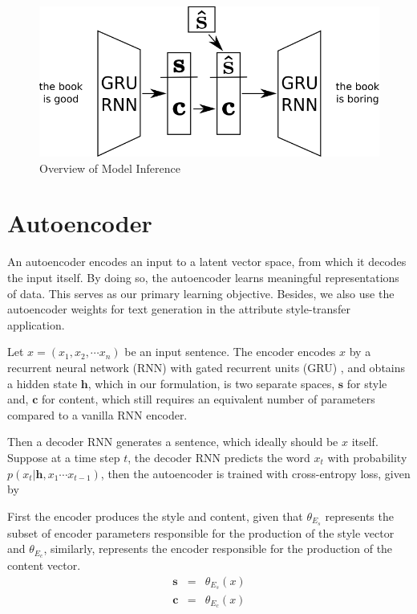 \begin{figure}[ht]
	\centering
	\includegraphics[width=\linewidth]{images/model-overview-inference}
	\caption{Overview of Model Inference}
	\label{fig:model-overview-inference}
\end{figure}


\section{Autoencoder} \label{ssec:seq2seq-objective}

An autoencoder encodes an input to a latent vector space, from which it decodes the input itself. By doing so, the autoencoder learns meaningful representations of data. This serves as our primary learning objective. Besides, we also use the autoencoder weights  for text generation in the attribute style-transfer application.

Let $x=(x_1, x_2, \cdots x_n)$ be an input sentence. The encoder encodes $x$ by a recurrent neural network (RNN) with gated recurrent units (GRU) \citep{cho2014learning}, and obtains a hidden state $\bm h$, which in our formulation, is two separate spaces, $\bm s$ for style and, $\bm c$ for content, which still requires an equivalent number of parameters compared to a vanilla RNN encoder.

Then a decoder RNN generates a sentence, which ideally should be $x$ itself. Suppose at a time step $t$, the decoder RNN predicts the word $x_t$ with probability $p(x_t | \bm h, x_1 \cdots x_{t-1})$, then the autoencoder is trained with cross-entropy loss, given by

First the encoder produces the style and content, given that $\theta_{E_s}$ represents the subset of encoder parameters responsible for the production of the style vector and $\theta_{E_c}$, similarly, represents the encoder responsible for the production of the content vector.
\begin{eqnarray*}
	\bm s &=& \theta_{E_s}(x) \nonumber \\
	\bm c &=& \theta_{E_c}(x) \nonumber
\end{eqnarray*}


